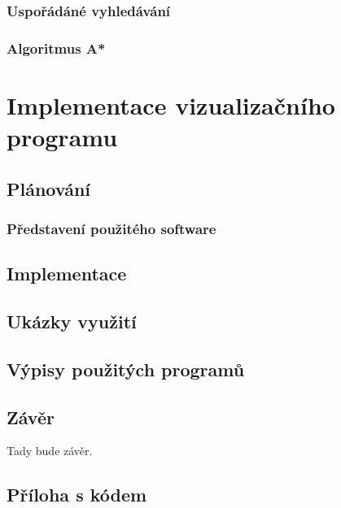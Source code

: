 \documentclass[12pt]{report}			%
\begin{document}
			\section{Uspořádáné vyhledávání}
			
			\section{Algoritmus A*}
			
			
			
			
	
	\part{Implementace vizualizačního programu}
	
		
		
		\chapter{Plánování}
			\section{Představení použitého software}
		
		\chapter{Implementace}
		
		\chapter{Ukázky využití}
		
		\chapter{Výpisy použitých programů}




	\chapter*{Závěr}
	
		Tady bude závěr.
	
	\nocite{*}
    \printbibliography					%
    \printglossary[title={Zkratky}]		%
    \listoffigures						%
    \listoftables						%

    \begin{appendices}
	\chapter{Příloha s kódem}	

	\end{appendices}
\end{document}
